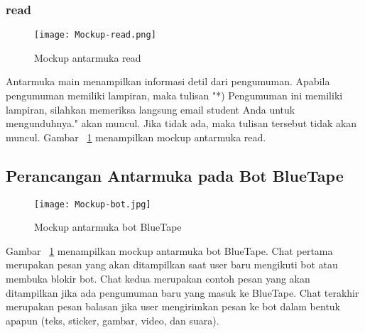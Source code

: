 \subsubsection{read}

\begin{figure}[H]
	\centering  
	\texttt{[image: Mockup-read.png]}  
	\caption[Mockup antarmuka read]{Mockup antarmuka read} 
	\label{fig:mockup-main} 
\end{figure}

Antarmuka main menampilkan informasi detil dari pengumuman. Apabila pengumuman memiliki lampiran, maka tulisan "*) Pengumuman ini memiliki lampiran, silahkan memeriksa langsung email student Anda untuk mengunduhnya." akan muncul. Jika tidak ada, maka tulisan tersebut tidak akan muncul. Gambar~ \ref{fig:mockup-main} menampilkan mockup antarmuka read.

\subsection{Perancangan Antarmuka pada Bot BlueTape}

\begin{figure}[H]
	\centering  
	\texttt{[image: Mockup-bot.jpg]}  
	\caption[Mockup antarmuka read]{Mockup antarmuka bot BlueTape} 
	\label{fig:mockup-bot} 
\end{figure}

Gambar~ \ref{fig:mockup-main} menampilkan mockup antarmuka bot BlueTape. Chat pertama merupakan pesan yang akan ditampilkan saat user baru mengikuti bot atau membuka blokir bot. Chat kedua merupakan contoh pesan yang akan ditampilkan jika ada pengumuman baru yang masuk ke BlueTape. Chat terakhir merupakan pesan balasan jika user mengirimkan pesan ke bot dalam bentuk apapun (teks, sticker, gambar, video, dan suara).